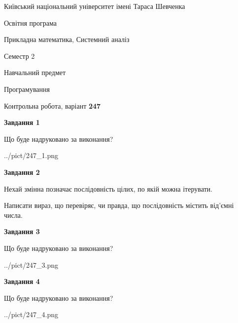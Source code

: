 \documentclass[12pt, ukrainian]{article}
\begin{document}
{{\begin {small}\par
{ \center  Київський національний університет імені Тараса Шевченка \par}
{\parbox {5 cm}{Освітня програма \hfill}{\parbox {8 cm}{Прикладна математика, Системний аналіз \hfill}}\parbox {5 cm}{\hfill Семестр 2}}\par
{\parbox {5 cm} {Навчальний предмет \hfill}\parbox {7 cm}{Програмування \hfill}\parbox {6cm}{\hfill}\par}\vspace{-7pt} \end{small}}{\center Контрольна робота, варіант  \No \textbf
{ 247 }\par}}
{
\begin {large}
{\begin {center}\textbf{Завдання 1}\end {center}}\par
Що буде надруковано за виконання?\par\par
\begin{center}
	{../pict/247_1.png}
\end{center}
\newpage

{\begin {center}\textbf{Завдання 2}\end {center}}\par
Нехай змінна  позначає послідовність цілих, по якій можна ітерувати.

Написати вираз, що перевіряє, чи правда, що послідовність  містить від’ємні числа.\par
\newpage

{\begin {center}\textbf{Завдання 3}\end {center}}\par
Що буде надруковано за виконання?
\begin{center}
	{../pict/247_3.png}
\end{center}
\newpage

{\begin {center}\textbf{Завдання 4}\end {center}}\par
Що буде надруковано за виконання?\par
\begin{center}
	{../pict/247_4.png}
\end{center}
\newpage


\end{large}}
\end{document}
